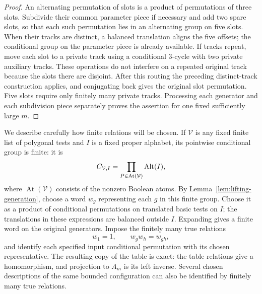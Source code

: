 \begin{proof}
An alternating permutation of slots is a product of permutations of
three slots.  Subdivide their common parameter piece if necessary and
add two spare slots, so that each such permutation lies in an
alternating group on five slots.  When their tracks are distinct, a
balanced translation aligns the five offsets; the conditional group
on the parameter piece is already available.  If tracks repeat, move
each slot to a private track using a conditional $3$-cycle with two
private auxiliary tracks.  These operations do not interfere on a
repeated original track because the slots there are disjoint.  After
this routing the preceding distinct-track construction applies, and
conjugating back gives the original slot permutation.  Five slots
require only finitely many private tracks.  Processing each generator
and each subdivision piece separately proves the assertion for one
fixed sufficiently large $m$.
\end{proof}

We describe carefully how finite relations will be chosen.  If
$\mathcal V$ is any fixed finite list of polygonal tests and $I$ is
a fixed proper alphabet, its pointwise conditional group is finite:
it is
\begin{equation}\label{eq:pointwise-table}
 C_{\mathcal V,I}=\prod_{P\in\operatorname{At}(\mathcal V)}\operatorname{Alt}(I),
\end{equation}
where $\operatorname{At}(\mathcal V)$ consists of the nonzero Boolean
atoms.  By Lemma~\ref{lem:lifting-generation}, choose a word $w_g$
representing each $g$ in this finite group.  Choose it as a product
of conditional permutations on translated basic tests on $I$;
the translations in these expressions are balanced outside $I$.
Expanding gives a finite word on the original generators.
Impose the finitely many true relations
\begin{equation}\label{eq:table-relations}
 w_1=1,\qquad w_gw_h=w_{gh},
\end{equation}
and identify each specified input conditional permutation with its
chosen representative.  The resulting copy of the table is exact:
the table relations give a homomorphism, and projection to $A_m$ is
its left inverse.  Several chosen descriptions of the same bounded
configuration can also be identified by finitely many true relations.

